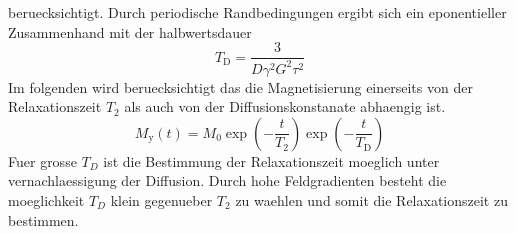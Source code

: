 beruecksichtigt. Durch periodische Randbedingungen ergibt sich ein eponentieller
Zusammenhand mit der halbwertsdauer
\begin{equation}%
  \label{eq:diffkoef}
  T_\text{D} = \frac{3}{D \gamma^2 G^2 \tau^2}
\end{equation}
Im folgenden wird beruecksichtigt das die Magnetisierung einerseits von der
Relaxationszeit $T_2$ als auch von der Diffusionskonstanate abhaengig ist.
\begin{equation}
		\label{eq:my}
		M_\text{y}(t) = M_0 \exp \left( - \frac{t}{T_2} \right) \exp \left( -
		\frac{t}{T_\text{D}} \right)
\end{equation}
Fuer grosse $T_D$ ist die Bestimmung der Relaxationszeit moeglich unter
vernachlaessigung der Diffusion. 
Durch hohe Feldgradienten besteht die moeglichkeit $T_D$ klein gegenueber $T_2$
zu waehlen und somit die Relaxationszeit zu bestimmen. 
